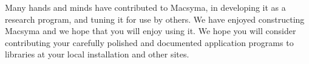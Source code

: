 Many hands and minds have contributed to Macsyma, in developing
it as a research program, and tuning it for use by others.
We have enjoyed constructing
Macsyma and we hope that you will enjoy using it.
We hope you will consider
contributing your carefully polished and documented
application programs to libraries at your local installation and
other sites.
